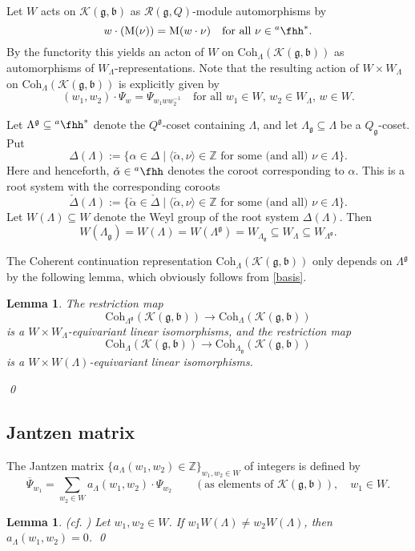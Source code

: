 \documentclass[12pt,a4paper]{amsart}
\def\subset{\subseteq}
\newcommand{\CK}{{\mathcal {K}}}
\newcommand{\g}{\mathfrak g}
\renewcommand{\b}{\mathfrak b}
\newcommand{\Z}{\mathbb{Z}}
\newcommand{\la}{\langle}
\newcommand{\ra}{\rangle}
\numberwithin{equation}{section}
\newtheorem{lem}[thm]{Lemma}
\theoremstyle{remark}
\def\cf{\emph{cf.} }
\def\hha{{}^a\fhh}
\def\Coh{\mathrm{Coh}}
\begin{document}
Let $W$ acts on  $\CK(\g,\b)$ as $\mathcal R(\g, Q)$-module automorphisms by
\[
  w\cdot (\mathrm M(\nu))=\mathrm M(w\cdot \nu)\quad \textrm{for all }\nu\in \hha^*.
\]
By the functority this yields an acton of $W$ on  $\Coh_{\Lambda}( \CK(\g,\b))$ as  automorphisms of $W_\Lambda$-representations. Note that
the resulting action of $W\times W_\Lambda$ on $\Coh_{\Lambda}( \CK(\g,\b))$ is explicitly given by
 \[
   (w_1, w_2)\cdot  \Psi_{w}=\Psi_{w_1 w w_2^{-1}}\quad\textrm{for all $w_1\in W$, $w_2\in W_\Lambda$,  $w\in W$.}
 \]


Let $\Lambda^\g\subset \hha^*$ denote the $Q^\g$-coset containing $\Lambda$, and let  $\Lambda_\g\subset \Lambda$ be a $Q_\g$-coset.
Put
\[
  \Delta(\Lambda):=\{\alpha\in \Delta\mid \la \check \alpha, \nu\ra\in \Z \textrm{ for some (and all) }\nu\in \Lambda\}.
\]
Here and henceforth,  $\check \alpha\in \hha$ denotes the coroot corresponding to $\alpha$.
This is a root system with the corresponding coroots
\[
  \check \Delta(\Lambda):=\{\check \alpha\in \check \Delta \mid \la \check \alpha, \nu\ra\in \Z \textrm{ for some (and all) }\nu\in \Lambda\}.
\]
Let $W(\Lambda)\subset W$ denote the Weyl group of the root system $\Delta(\Lambda)$. Then
\[
  W(\Lambda_\g)=W(\Lambda)=W(\Lambda^\g)=W_{\Lambda_\g}\subset W_{\Lambda}\subset  W_{\Lambda^\g}.
\]


The Coherent continuation representation $\Coh_{\Lambda}( \CK(\g,\b))$ only depends on $\Lambda^\g$ by the following lemma, which obviously follows from \eqref{basis}.
\begin{lem}\label{restco0}
The restriction map
\[
  \Coh_{\Lambda^\g}( \CK(\g,\b))\rightarrow \Coh_{\Lambda}( \CK(\g,\b))
\]
is a $W\times W_\Lambda$-equivariant  linear isomorphisms,
and the restriction map
\[
 \Coh_{\Lambda}( \CK(\g,\b))\rightarrow \Coh_{\Lambda_\g}( \CK(\g,\b))
\]
is a $W\times W(\Lambda)$-equivariant  linear isomorphisms.

\qed
\end{lem}


\subsection{Jantzen matrix}

The Jantzen matrix $\{a_{\Lambda}(w_1, w_2)\in \Z\}_{w_1, w_2\in W}$ of integers is defined by
\[
  \overline \Psi_{w_1}=\sum_{w_2\in W}  a_{\Lambda}(w_1, w_2) \cdot  \Psi_{w_2}   \qquad (\textrm{as elements of $\CK(\g,\b)$}), \quad w_1\in W.
\]


\begin{lem}\label{lem33} (\cf \cite[Section 5.2]{H})
 Let $w_1, w_2\in W$. If $w_1 W(\Lambda)\neq w_2 W(\Lambda)$, then $a_{\Lambda}(w_1, w_2)=0$.
\qed
\end{lem}
\end{document}
